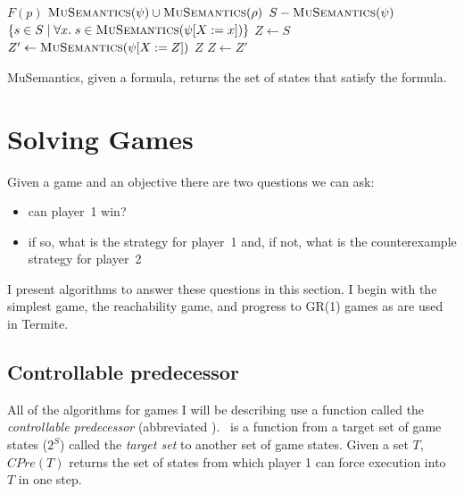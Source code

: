 \begin{algorithm}
\begin{algorithmic}

        \State\Return $F(p)$
    \ElsIf {$\phi = \psi \vee \rho$}
        \State\Return $\Call{MuSemantics}{\psi} \cup \Call{MuSemantics}{\rho}$
    \ElsIf {$\phi = \neg \psi$}
        \State\Return $S - \Call{MuSemantics}{\psi}$
    \State\Return $\{ s \in S \; | \; \forall x. \; s \in \Call{MuSemantics}{\psi[X:=x]} \}$
        \State $Z \gets S$
        \Loop
            \State $Z' \gets \Call{MuSemantics}{\psi[X:=Z]}$
                \State\Return $Z$
            \EndIf
            \State $Z \gets Z'$
        \EndLoop
    \EndIf
\EndFunction

\end{algorithmic}
\caption{MuSemantics, given a \mucalc formula, returns the set of states that satisfy the formula.}
\label{a:mu_semantics}
\end{algorithm}

\section{Solving Games}
\label{sec:intro_solving}

Given a game and an objective there are two questions we can ask:
\begin{itemize}
    \item can player~1 win?
    \item if so, what is the strategy for player~1 and, if not, what is the counterexample strategy for player~2
\end{itemize}

I present algorithms to answer these questions in this section. I begin with the simplest game, the reachability game, and progress to GR(1) games as are used in Termite.

\subsection{Controllable predecessor}
\label{sec:back_cpre}

All of the algorithms for games I will be describing use a function called the \emph{controllable predecessor} (abbreviated \cpre). \cpre\ is a function from a target set of game states ($2^S$) called the \emph{target set} to another set of game states. Given a set $T$, $CPre(T)$ returns the set of states from which player 1 can force execution into $T$ in one step. 

